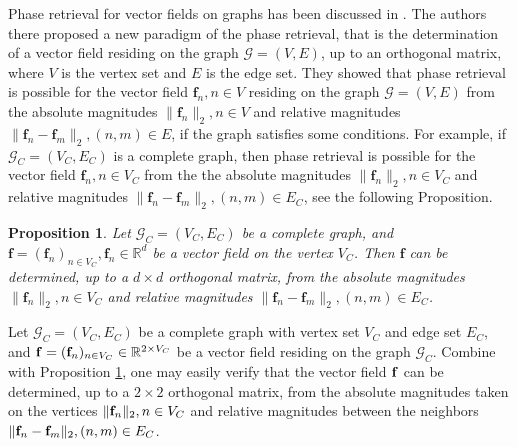\documentclass[12pt,oneside,reqno]{amsart}
\newtheorem{proposition}[theorem]{Proposition}%
\newcommand{\R}{\mathbb{R}}
\numberwithin{equation}{section}
\begin{document}
	Phase retrieval for vector fields on graphs has been discussed in \cite{chen2022phase}. The authors there proposed a new paradigm of the phase retrieval, that is the determination of a vector field residing on the graph  $\mathcal{G}=(V, E)$, up to an orthogonal matrix, where $V$ is the vertex set and $E$ is the edge set. They showed that phase retrieval is possible for the vector field $\mathbf{f}_n, n\in V$ residing on the graph $\mathcal{G}=(V, E)$ from the absolute magnitudes $\|\mathbf{f}_n\|_2, n\in V$ and relative magnitudes $\|\mathbf{f}_n-\mathbf{f}_m\|_2, (n, m)\in E$, if the graph satisfies some conditions. For example, if  $\mathcal{G}_C=(V_C, E_C)$ is a complete graph, then phase retrieval is possible for the vector field $\mathbf{f}_n, n\in V_C$ from the the absolute magnitudes $\|\mathbf{f}_n\|_2, n\in V_C$ and relative magnitudes $\|\mathbf{f}_n-\mathbf{f}_m\|_2, (n, m)\in E_C$, see the following Proposition.  
	
	\smallskip
	\begin{proposition}\label{complete.prop.jfa}\cite[Theorem 4.1]{chen2022phase}
		Let $\mathcal{G}_C=(V_C, E_C)$ be a complete graph, and $\mathbf{f}=(\mathbf{f}_n)_{n\in V_C}, \mathbf{f}_n\in \R^d$ be a vector field on the vertex $V_C$. Then $\mathbf{f}$  can be determined, up to a $d\times d$ orthogonal matrix, from the absolute magnitudes $\|\mathbf{f}_n\|_2, n\in V_C$ and relative magnitudes $\|\mathbf{f}_n-\mathbf{f}_m\|_2, (n, m)\in E_C$.
	\end{proposition}
	
	
	\smallskip
	
		Let ${\mathcal G}_C=(V_C, E_C)$ be a complete graph with vertex set $V_C$ and edge set $E_C$, and ${\bf f}=({\bf f}_n)_{n\in V_C}\in \R^{2\times V_C}$ be a vector field residing on the graph ${\mathcal G}_C$.  Combine with  Proposition \ref{complete.prop.jfa}, one may easily verify that  the vector field $\bf f$ can be determined, up to a $2\times 2$ orthogonal matrix, from the absolute magnitudes taken on the vertices $\|{\bf f}_n\|_2, n\in V_C$ and relative magnitudes between the neighbors $\|{\bf f}_n - {\bf f}_m\|_2, (n,m) \in E_C$.  
	
\end{document}
